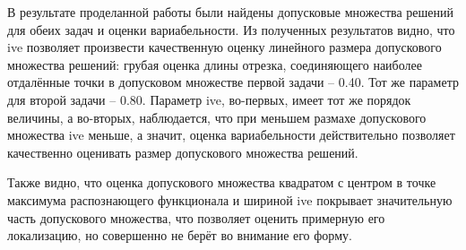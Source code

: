 В результате проделанной работы были найдены допусковые множества решений для обеих задач и оценки вариабельности. Из полученных результатов видно, что ive позволяет произвести качественную оценку линейного размера допускового множества решений: грубая оценка длины отрезка, соединяющего наиболее отдалённые точки в допусковом множестве первой задачи -- 0.40. 
Тот же параметр для второй задачи -- 0.80. Параметр ive, во-первых, имеет тот же порядок величины, а во-вторых, наблюдается, что при меньшем размахе допускового множества ive меньше, а значит, оценка вариабельности действительно позволяет качественно оценивать размер допускового множества решений.

Также видно, что оценка допускового множества квадратом с центром в точке максимума распознающего функционала и шириной ive покрывает значительную часть допускового множества, что позволяет оценить примерную его локализацию, но совершенно не берёт во внимание его форму.